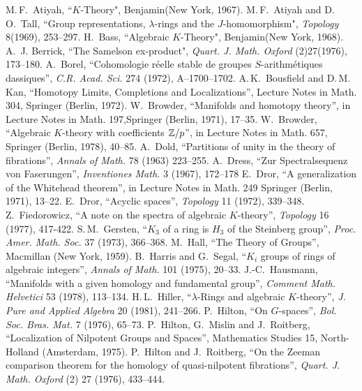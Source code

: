 
%
\begin{thebibliography}{99}
 M.\,F.~Atiyah, ``$K$-Theory", Benjamin(New York, 1967).
 M.\,F.~Atiyah and D.\,O.~Tall, ``Group representations, $\lambda$-rings and the $J$-homomorphism",  {\em Topology} 8(1969), 253--297.
 H.~Bass, ``Algebraic $K$-Theory", Benjamin(New York, 1968).
 A.~J. Berrick, ``The Samelson ex-product", {\em Quart. J. Math. Oxford} (2)27(1976), 173--180.
 A.~Borel, ``Cohomologie r\'eelle stable de groupes $S$-arithm\'etiques dassiques'', {\em C.R. Acad. Sci.} 274 (1972), A--1700--1702. 
A.\,K.~Bousfield and D.\,M.~ Kan, ``Homotopy Limits, Completions and Localizations'', Lecture Notes in Math. 304, Springer (Berlin, 1972).
 W.~Browder, ``Manifolds and homotopy theory'', in Lecture Notes in Math. 197,Springer (Berlin, 1971), 17--35.
 W.~Browder, ``Algebraic $K$-theory with coefficients $\mathbb{Z}/p$'', in Lecture Notes in Math. 657, Springer (Berlin, 1978), 40--85.
 A.~Dold, ``Partitions of unity in the theory of fibrations'', {\em Annals of Math.} 78 (1963) 223--255.
 A.~Dress, ``Zur Spectralsequenz von Faserungen'', {\em Inventiones Math.} 3 (1967), 172--178
 E.~Dror, ``A generalization of the Whitehead theorem'', in Lecture Notes in Math. 249 Springer (Berlin, 1971), 13--22.
 E.~Dror, ``Acyclic spaces'', {\em Topology} 11 (1972), 339--348.
 Z.~Fiedorowicz, ``A note on the spectra of algebraic $K$-theory'', {\em Topology} 16 (1977), 417-422.
 S.\,M.~Gersten, ``$K_3$ of a ring is $H_3$ of the Steinberg group'', {\em Proc. Amer. Math. Soc.} 37 (1973), 366--368.
 M.~Hall, ``The Theory of Groups'', Macmillan (New York, 1959).
 B.~Harris and G.~Segal, ``$K_i$ groups of rings of algebraic integers'', {\em Annals of Math.} 101 (1975), 20--33.
 J.-C.~Hausmann, ``Manifolds with a given homology and fundamental group'', {\em Comment Math. Helvetici} 53 (1978), 113--134.
 H.\,L.~Hiller, ``$\lambda$-Rings and algebraic $K$-theory'', {\em J. Pure and Applied Algebra} 20 (1981), 241--266.
 P.~Hilton, ``On $G$-spaces'', {\em Bol. Soc. Bras. Mat.} 7 (1976), 65--73.
 P.~Hilton, G.~Mislin and J.~Roitberg, ``Localization of Nilpotent Groups and Spaces'', Mathematics Studies 15, North-Holland (Amsterdam, 1975).
 P.~Hilton and J.~Roitberg, ``On the Zeeman comparison theorem for the homology of quasi-nilpotent fibrations'', {\em Quart. J. Math. Oxford} (2) 27 (1976), 433--444.

\end{thebibliography}
